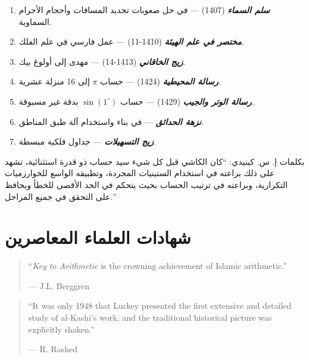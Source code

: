 \documentclass[11pt,a4paper]{book}
\newcommand{\ar}[1]{\arabicfont\beginR #1\endR}
\begin{document}
\begin{enumerate}[label=\arabic*.]
  \item \textbf{\textit{\ar{سلم السماء}}} \ar{(1407) — في حل صعوبات تحديد المسافات وأحجام الأجرام السماوية.}
  \item \textbf{\textit{\ar{مختصر في علم الهيئة}}} \ar{(1410-11) — عمل فارسي في علم الفلك.}
  \item \textbf{\textit{\ar{زيج الخاقاني}}} \ar{(1413-14) — مهدى إلى أولوغ بيك.}
  \item \textbf{\textit{\ar{رسالة المحيطية}}} \ar{(1424) — حساب $\pi$ إلى 16 منزلة عشرية.}
  \item \textbf{\textit{\ar{رسالة الوتر والجيب}}} \ar{(1429) — حساب $\sin(1^\circ)$ بدقة غير مسبوقة.}
  \item \textbf{\textit{\ar{نزهة الحدائق}}} \ar{— في بناء واستخدام آلة طبق المناطق.}
  \item \textbf{\textit{\ar{زيج التسهيلات}}} \ar{— جداول فلكية مبسطة.}
\end{enumerate}

\vspace{0.5cm}
\noindent\ar{بكلمات إ. س. كينيدي: ``كان الكاشي قبل كل شيء سيد حساب ذو قدرة استثنائية، تشهد على ذلك براعته في استخدام الستينيات المجردة، وتطبيقه الواسع للخوارزميات التكرارية، وبراعته في ترتيب الحساب بحيث يتحكم في الحد الأقصى للخطأ ويحافظ على التحقق في جميع المراحل.''}
\clearpage

\chapter{\ar{شهادات العلماء المعاصرين}}
\label{app:scholars}

\begin{quote}
``\textit{Key to Arithmetic} is the crowning achievement of Islamic arithmetic.''
\begin{flushright}
--- J.L. Berggren
\end{flushright}
\end{quote}

\vspace{0.3cm}

\begin{quote}
``It was only 1948 that Luckey presented the first extensive and detailed study of al-Kashi's work, and the traditional historical picture was explicitly shaken.''
\begin{flushright}
--- R. Rashed
\end{flushright}
\end{quote}
\end{document}
